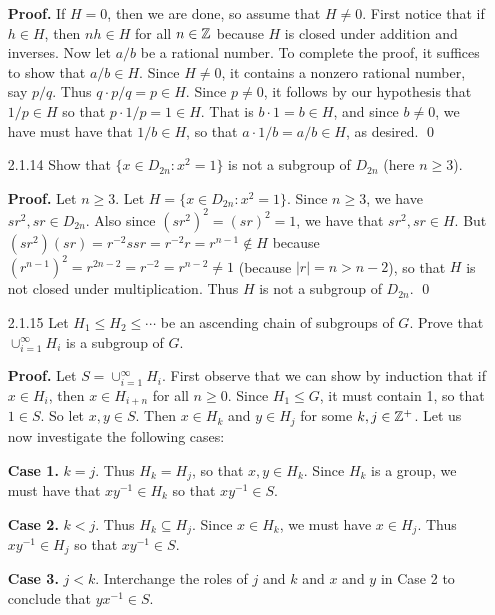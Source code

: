\begin{enumerate}
      \textbf{Proof.} If $H = 0$, then we are done, so assume that $H \neq 0$.
      First notice that if $h \in H$, then $nh \in H$ for all $n \in \mathbb{Z}$ because
      $H$ is closed under addition and inverses. Now let $a/b$ be a rational 
      number. To complete the proof, it suffices to show that $a/b \in H$. Since
      $H \neq 0$, it contains a nonzero rational number, say $p/q$.
      Thus $q \cdot p/q = p \in H$. Since $p \neq 0$, it follows by our 
      hypothesis that $1/p \in H$ so that $p \cdot 1/p = 1 \in H$. That is
      $b \cdot 1 = b \in H$, and since $b \neq 0$, we have must have that
      $1/b \in H$, so that $a \cdot 1/b = a/b \in H$, as desired. \qed
   \item[2.1.14]  Show that $\{x \in D_{2n} : x^2 = 1\}$ is not a subgroup of
                  $D_{2n}$ (here $n \ge 3$).

      \textbf{Proof.} Let $n \ge 3$. Let $H = \{x \in D_{2n} : x^2 = 1\}$. Since
      $n \ge 3$, we have $sr^2, sr \in D_{2n}$. Also since
      $(sr^2)^2 = (sr)^2 = 1$, we have that $sr^2, sr \in H$. But
      $(sr^2)(sr) = r^{-2}ssr = r^{-2}r = r^{n-1} \notin H$ because
      $(r^{n-1})^2 = r^{2n-2} = r^{-2} = r^{n-2} \neq 1$ (because
      $|r| = n > n - 2$), so that $H$ is not closed under multiplication. Thus
      $H$ is not a subgroup of $D_{2n}$. \qed
   \item[2.1.15]  Let $H_1 \le H_2 \le \cdots$ be an ascending chain of
                  subgroups of $G$. Prove that $\cup_{i=1}^\infty H_i$ is a 
                  subgroup of $G$.

      \textbf{Proof.} Let $S = \cup_{i=1}^\infty H_i$. First observe that we
      can show by induction that if $x \in H_i$, then $x \in H_{i+n}$ for all
      $n \ge 0$. Since $H_1 \le G$, it must contain 1, so that $1 \in S$. So
      let $x, y \in S$. Then $x \in H_k$ and $y \in H_j$ for some
      $k, j \in \mathbb{Z}^+$. Let us now investigate the following cases:

      \textbf{Case 1.} $k = j$. Thus $H_k = H_j$, so that $x, y \in H_k$. Since
      $H_k$ is a group, we must have that $xy^{-1} \in H_k$ so that
      $xy^{-1} \in S$.

      \textbf{Case 2.} $k < j$. Thus $H_k \subseteq H_j$. Since $x \in H_k$, we 
      must have $x \in H_j$. Thus $xy^{-1} \in H_j$ so that $xy^{-1} \in S$.

      \textbf{Case 3.} $j < k$. Interchange the roles of $j$ and $k$ and $x$
      and $y$ in Case 2 to conclude that $yx^{-1} \in S$. \\


\end{enumerate}
